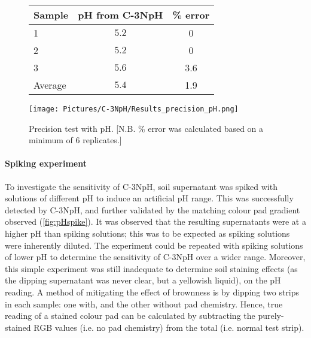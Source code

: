 \begin{figure}[h!]
	\centering
	\begin{minipage}[c]{0.5\textwidth}
		\centering
		\begin{tabular} {l c c}
			\toprule
			\textbf{Sample} & \textbf{pH from C-3NpH} & \textbf{\% error} \\
			\midrule
			1 & $5.2$ & 0 \\
			2 & $5.2$ & 0 \\
			3 & $5.6$ & 3.6 \\
			\midrule
			Average & $5.4$ & 1.9\\
			\bottomrule
		\end{tabular}
		\label{table:pH_precision}
	\end{minipage}
	\begin{minipage}[c]{0.4\textwidth}
		\centering
		\texttt{[image: Pictures/C-3NpH/Results\_precision\_pH.png]}
	\end{minipage}
	\captionsetup{justification = centering}
	\caption{Precision test with pH. \small [N.B. \% error was calculated based on a minimum of 6 replicates.]}
	
	\label{fig:precision_pH}
\end{figure}

\paragraph{Spiking experiment}

To investigate the sensitivity of C-3NpH, soil supernatant was spiked with solutions of different pH to induce an artificial pH range. This was successfully detected by C-3NpH, and further validated by the matching colour pad gradient observed (\cref{fig:pHspike}). It was observed that the resulting supernatants were at a higher pH than spiking solutions; this was to be expected as spiking solutions were inherently diluted. The experiment could be repeated with spiking solutions of lower pH to determine the sensitivity of C-3NpH over a wider range. 
Moreover, this simple experiment was still inadequate to determine soil staining effects (as the dipping supernatant was never clear, but a yellowish liquid), on the pH reading. A method of mitigating the effect of brownness is by dipping two strips in each sample: one with, and the other without pad chemistry. Hence, true reading of a stained colour pad can be calculated by subtracting the purely-stained RGB values (i.e. no pad chemistry) from the total (i.e. normal test strip). 

